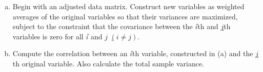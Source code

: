 \documentclass[11pt, a4paper]{article}
\begin{document}
\begin{enumerate}
	\begin{enumerate}[(a)]
		\item Begin with an adjusted data matrix. Construct new variables as weighted averages of the original variables so that their variances are maximized, subject to the constraint that the covariance between the ݅$i$th and ݆$j$th variables is zero for all ݅$i$ and $j$ ݆$(i \neq j)$. 
		
		\item Compute the correlation between an ݅$i$th variable, constructed in (a) and the ݆$j$th original variable. Also calculate the total sample variance. 
	
	\end{enumerate}






	




\end{enumerate}
\end{document}
